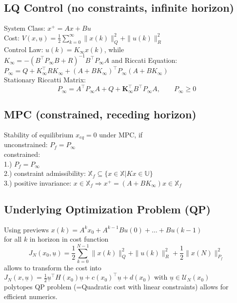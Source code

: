 \documentclass[english]{latex4ei/latex4ei_sheet}
\begin{document}
\begin{sectionbox}
\subsection{LQ Control (no constraints, infinite horizon)}
System Class: $x^{+}=A x+B u$ \\
Cost: $V(x, \underline{u})=\frac{1}{2} \sum\limits_{k=0}^{\infty}\|x(k)\|_{Q}^{2}+\|u(k)\|_{R}^{2}$ \\
Control Law: $u(k)=K_{\infty} x(k)$, while \\ $K_{\infty}=-\left(B^{\top} P_{\infty} B+R\right)^{-1} B^{\top} P_{\infty} A$ and Riccati Equation:\\ 
${P_{\infty}=Q+K_{\infty}^{\top} R K_{\infty}+\left(A+B K_{\infty}\right)^{\top} P_{\infty}\left(A+B K_{\infty}\right)}$\\
Stationary Riccatti Matrix:
$$P_{\infty}=A^{\top} P_{\infty} A+Q+\boldsymbol{K}_{\infty}^{\top}B^{\top} P_{\infty}A,\qquad P_{\infty}\geq 0$$

\subsection{MPC (constrained, receding horizon)}
Stability of equilibrium $x_{eq}=0$ under MPC, if\\
unconstrained: $P_{f}=P_{\infty}$\\
constrained:\\
1.) $P_{f}=P_{\infty}$ \\
2.) constraint admissibility: $\mathbb{X}_{f} \subseteq\{x \in \mathbb{X} | K x \in \mathbb{U}\}$ \\
3.) positive invariance: $x \in \mathbb{X}_{f} \Rightarrow x^{+}=\left(A+B K_{\infty}\right) x \in \mathbb{X}_{f}$\\

\subsection{Underlying Optimization Problem (QP)}
Using previews $x(k)=A^{k}x_{0}+A^{k-1}Bu(0)+\ldots+Bu(k-1)$\\
for all $k$ in horizon in cost function 
$$J_{N}\left(x_{0}, \underline{u}\right)=\frac{1}{2} \sum\limits_{k=0}^{N-1}\|x(k)\|_{Q}^{2}+\|u(k)\|_{R}^{2}+\frac{1}{2}\|x(N)\|_{P_{f}}^{2}$$
allows to transform the cost into\\ $J_N(x,\underline{u})=\frac{1}{2}\underline{u}^{\top}H(x_0)\underline{u}+c(x_{0})^{\top}\underline{u}+d(x_{0})$ with $\underline{u}\in\mathcal{U}_{N}(x_{0})$\\polytopes QP problem (=Quadratic cost with linear constraints) allows for efficient numerics.

\end{sectionbox}
\end{document}
